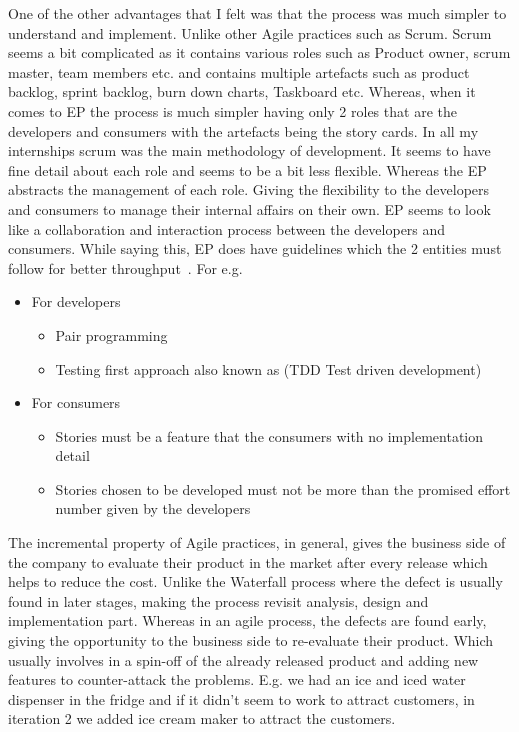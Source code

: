 One of the other advantages that I felt was that the process was much simpler to understand and implement. Unlike other Agile practices such as Scrum. Scrum seems a bit complicated as it contains various roles such as Product owner, scrum master, team members etc. and contains multiple artefacts such as product backlog, sprint backlog, burn down charts, Taskboard etc. Whereas, when it comes to EP the process is much simpler having only 2 roles that are the developers and consumers with the artefacts being the story cards. In all my internships scrum was the main methodology of development. It seems to have fine detail about each role and seems to be a bit less flexible. Whereas the EP abstracts the management of each role. Giving the flexibility to the developers and consumers to manage their internal affairs on their own. EP seems to look like a collaboration and interaction process between the developers and consumers. While saying this, EP does have guidelines which the 2 entities must follow for better throughput~\cite{copeland_2001}. For e.g.
\begin{itemize}
    \item For developers
          \begin{itemize}
              \item Pair programming
              \item Testing first approach also known as (TDD Test driven development)
          \end{itemize}
    \item For consumers
          \begin{itemize}
              \item Stories must be a feature that the consumers with no implementation detail
              \item Stories chosen to be developed must not be more than the promised effort number given by the developers
          \end{itemize}
\end{itemize}

The incremental property of Agile practices, in general, gives the business side of the company to evaluate their product in the market after every release which helps to reduce the cost. Unlike the Waterfall process where the defect is usually found in later stages, making the process revisit analysis, design and implementation part. Whereas in an agile process, the defects are found early, giving the opportunity to the business side to re-evaluate their product. Which usually involves in a spin-off of the already released product and adding new features to counter-attack the problems. E.g. we had an ice and iced water dispenser in the fridge and if it didn't seem to work to attract customers, in iteration 2 we added ice cream maker to attract the customers.

